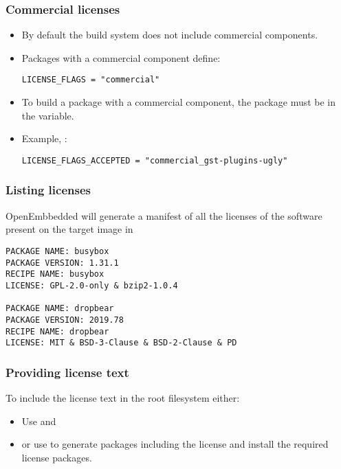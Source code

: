 \begin{frame}[fragile]
  \frametitle{Commercial licenses}
  \begin{itemize}
    \item By default the build system does not include commercial
      components.
    \item Packages with a commercial component define:
      \begin{block}{}
      \begin{verbatim}
LICENSE_FLAGS = "commercial"
      \end{verbatim}
      \end{block}
    \item To build a package with a commercial component, the package
      must be in the  variable.
    \item Example, :
      \begin{block}{}
      \begin{verbatim}
LICENSE_FLAGS_ACCEPTED = "commercial_gst-plugins-ugly"
      \end{verbatim}
      \end{block}
  \end{itemize}
\end{frame}

\begin{frame}[fragile]
  \frametitle{Listing licenses}
  OpenEmbbedded will generate a manifest of all the licenses of the
  software present on the target image in
  \begin{block}{}
    \fontsize{9}{9}\selectfont
    \begin{verbatim}
PACKAGE NAME: busybox
PACKAGE VERSION: 1.31.1
RECIPE NAME: busybox
LICENSE: GPL-2.0-only & bzip2-1.0.4

PACKAGE NAME: dropbear
PACKAGE VERSION: 2019.78
RECIPE NAME: dropbear
LICENSE: MIT & BSD-3-Clause & BSD-2-Clause & PD
    \end{verbatim}
  \end{block}
\end{frame}

\begin{frame}[fragile]
  \frametitle{Providing license text}
  To include the license text in the root filesystem either:
  \begin{itemize}
  \item Use  and 
  \item or use  to generate
    packages including the license and install the required license
    packages.
  \end{itemize}
\end{frame}

